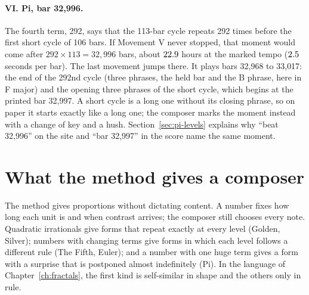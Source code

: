 \paragraph{VI. Pi, bar 32,996.} The fourth term, 292, says that the 113-bar cycle repeats 292 times before the first short cycle of 106 bars. If Movement V never stopped, that moment would come after $292 \times 113 = 32{,}996$ bars, about $22.9$ hours at the marked tempo ($2.5$ seconds per bar). The last movement jumps there. It plays bars 32{,}968 to 33{,}017: the end of the 292nd cycle (three phrases, the held bar and the B phrase, here in F major) and the opening three phrases of the short cycle, which begins at the printed bar 32{,}997. A short cycle is a long one without its closing phrase, so on paper it starts exactly like a long one; the composer marks the moment instead with a change of key and a hush. Section~\ref{sec:pi-levels} explains why ``beat 32,996'' on the site and ``bar 32,997'' in the score name the same moment.

\section{What the method gives a composer}

The method gives proportions without dictating content. A number fixes how long each unit is and when contrast arrives; the composer still chooses every note. Quadratic irrationals give forms that repeat exactly at every level (Golden, Silver); numbers with changing terms give forms in which each level follows a different rule (The Fifth, Euler); and a number with one huge term gives a form with a surprise that is postponed almost indefinitely (Pi). In the language of Chapter~\ref{ch:fractals}, the first kind is self-similar in shape and the others only in rule.

